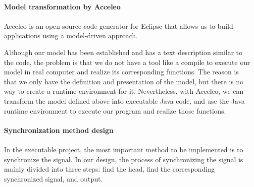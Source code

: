\documentclass{article}
\begin{document}
\paragraph{Model transformation by Acceleo} 

\paragraph{}

Acceleo is an open source code generator for Eclipse that allows us to build applications using a model-driven approach. 

Although our model has been established and has a text description similar to the code, the problem is that we do not have a tool like a compile to execute our model in real computer and realize its corresponding functions. The reason is that we only have the definition and presentation of the model, but there is no way to create a runtime environment for it. Nevertheless, with Acceleo, we can transform the model defined above into executable Java code, and use the Java runtime environment to execute our program and realize those functions.

\paragraph{Synchronization method design}

\paragraph{}

In the executable project, the most important method to be implemented is to synchronize the signal. In our design, the process of synchronizing the signal is mainly divided into three steps: find the head, find the corresponding synchronized signal, and output.
\end{document}

